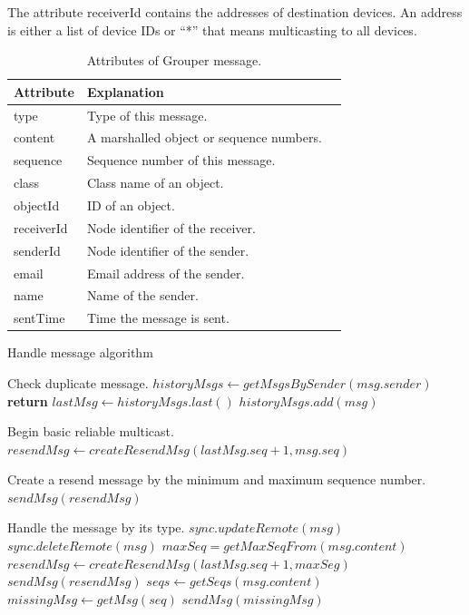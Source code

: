 \documentclass[twocolumn,10pt]{article}
\begin{document}
The attribute receiverId contains the addresses of destination devices.
An address is either a list of device IDs or ``*'' that means multicasting to all devices.

\begin{table}[t]
	\centering
	\caption{Attributes of Grouper message.}
	\label{my-label}
	\begin{tabular}{lll}
		\hline
		\textbf{Attribute} & \textbf{Explanation} \\ \hline
		type & Type of this message. \\
		content & A marshalled object or sequence numbers. \\
		sequence & Sequence number of this message. \\
		class & Class name of an object. \\
		objectId & ID of an object. \\
		receiverId & Node identifier of the receiver. \\
		senderId & Node identifier of the sender. \\
		email & Email address of the sender. \\
		name & Name of the sender. \\
		sentTime & Time the message is sent. \\
		\hline
	\end{tabular}
\end{table}

\begin{algorithm}[t]
	\caption{Handle message algorithm}\label{alg:euclid}
	\begin{algorithmic}[1]		
		\LeftComment Check duplicate message.
		\State  $historyMsgs \gets getMsgsBySender(msg.sender)$
		\State \textbf{return}
		\EndIf
		\State $lastMsg \gets historyMsgs.last()$
		\State $historyMsgs.add(msg)$
		 
		\LeftComment Begin basic reliable multicast.
		\State $resendMsg \gets createResendMsg(lastMsg.seq + 1, msg.seq)$
		
		\Comment Create a resend message by the minimum and maximum sequence number.
		\State $sendMsg(resendMsg)$
		\EndIf
		
		\LeftComment Handle the message by its type.
		\State $sync.updateRemote(msg)$
		\State $sync.deleteRemote(msg)$
		\State $maxSeq = getMaxSeqFrom(msg.content)$
		\State $resendMsg \gets createResendMsg(lastMsg.seq + 1, maxSeg)$
			\State $sendMsg(resendMsg)$
			\EndIf
		\State $seqs \gets getSeqs(msg.content)$
		\State $missingMsg \gets getMsg(seq)$
		\State $sendMsg(missingMsg)$
		\EndFor
		\EndIf
		\EndProcedure
	\end{algorithmic}
\end{algorithm}
\end{document}
